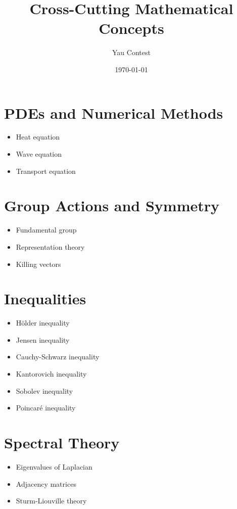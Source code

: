 \documentclass{amsart}
\title{Cross-Cutting Mathematical Concepts}
\author{Yau Contest}
\date{\today}
\begin{document}
\maketitle

\section{PDEs and Numerical Methods}
\begin{itemize}
    \item Heat equation
    \item Wave equation
    \item Transport equation
\end{itemize}

\section{Group Actions and Symmetry}
\begin{itemize}
    \item Fundamental group
    \item Representation theory
    \item Killing vectors
\end{itemize}

\section{Inequalities}
\begin{itemize}
    \item H\"older inequality
    \item Jensen inequality
    \item Cauchy-Schwarz inequality
    \item Kantorovich inequality
    \item Sobolev inequality
    \item Poincar\'e inequality
\end{itemize}

\section{Spectral Theory}
\begin{itemize}
    \item Eigenvalues of Laplacian
    \item Adjacency matrices
    \item Sturm-Liouville theory
\end{itemize}
\end{document}
